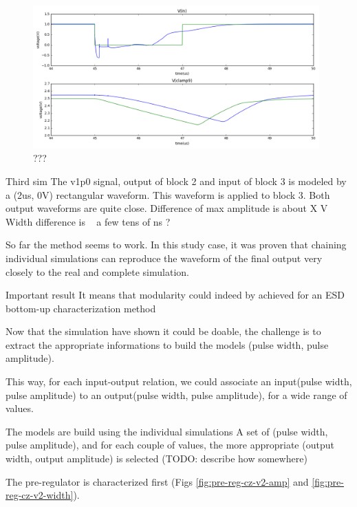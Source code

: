 \begin{figure}[!h]
  \centering
  \includegraphics[width=0.98\textwidth]{src/4/figures/simulation_comparison_block3.png}
  \caption{???}
  \label{fig:sim-compare-block3}
\end{figure}

Third sim
The v1p0 signal, output of block 2 and input of block 3 is modeled by a (2us, 0V) rectangular waveform.
This waveform is applied to block 3.
Both output waveforms are quite close.
Difference of max amplitude is about X V
Width difference is ~ a few tens of ns ?

So far the method seems to work.
In this study case, it was proven that chaining individual simulations can reproduce the waveform of the final output very closely to the real and complete simulation.

Important result
It means that modularity could indeed by achieved for an ESD bottom-up characterization method

Now that the simulation have shown it could be doable, the challenge is to extract the appropriate informations to build the models
(pulse width, pulse amplitude).

This way, for each input-output relation, we could associate an input(pulse width, pulse amplitude) to an output(pulse width, pulse amplitude), for a wide range of values.

The models are build using the individual simulations
A set of (pulse width, pulse amplitude), and for each couple of values, the more appropriate (output width, output amplitude) is selected (TODO: describe how somewhere)

The pre-regulator is characterized first (Figs \ref{fig:pre-reg-cz-v2-amp} and \ref{fig:pre-reg-cz-v2-width}).

